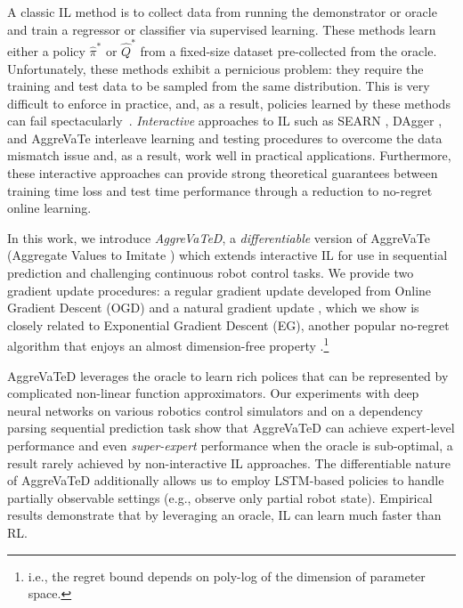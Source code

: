 \documentclass{article}
\newcommand{\arun}[1]{\textcolor{red}{\bf Arun: {#1}}}
\begin{document}
A classic IL method is to collect data from running the demonstrator or oracle and train a regressor or classifier via supervised learning. These methods \cite{abbeel2004apprenticeship,syed2008apprenticeship,ratliff2006maximum,ziebart2008maximum,finn2016guided,ho2016generative} learn either a policy $\hat \pi^*$ or $\hat Q^*$ from a fixed-size dataset pre-collected from the oracle. Unfortunately, these methods exhibit a pernicious problem:  they require the training and test data to be sampled from the same distribution.  This is very difficult to enforce in practice, and, as a result, policies learned by these methods can fail spectacularly~\cite{ross2010efficient}. \emph{Interactive} approaches to IL such as SEARN \cite{daume2009search}, DAgger \cite{Ross2011_AISTATS}, and AggreVaTe \cite{ross2014reinforcement} interleave learning and testing procedures to overcome the data mismatch issue and, as a result, work well in practical applications. Furthermore, these interactive approaches can provide strong theoretical guarantees between training time loss and test time performance through a reduction to no-regret online learning.




In this work, we introduce \emph{AggreVaTeD}, a \emph{differentiable} version of AggreVaTe (Aggregate Values to Imitate \cite{ross2014reinforcement}) which extends interactive IL for use in sequential prediction and challenging continuous robot control tasks.  We provide two gradient update procedures: a regular gradient update developed from Online Gradient Descent (OGD) \cite{Zinkevich2003_ICML} and a natural gradient update  \cite{kakade2002natural,bagnell2003covariant}, which we show is closely related to Exponential Gradient Descent (EG), another popular no-regret algorithm that enjoys an almost dimension-free property \cite{bubeck2015convex}.\footnote{i.e., the regret bound depends on poly-log of the dimension of parameter space.} %

AggreVaTeD leverages the oracle to learn rich polices that can be represented by complicated non-linear function approximators. Our experiments with deep neural networks on various robotics control simulators and on a dependency parsing sequential prediction task show that AggreVaTeD can achieve expert-level performance and even \emph{super-expert} performance when the oracle is sub-optimal, a result rarely achieved by non-interactive IL approaches. The differentiable nature of AggreVaTeD additionally allows us to employ LSTM-based policies to handle partially observable settings (e.g., observe only partial robot state). Empirical results demonstrate that by leveraging an oracle, IL can learn much faster than RL.
\end{document}
